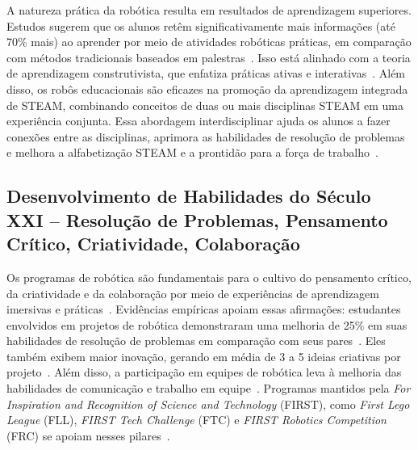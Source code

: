 \documentclass[%
  a4paper,%
  12pt,%
  fleqn,%
  english,%
  brazilian,%
]{article}
\begin{document}
A natureza prática da robótica resulta em resultados de aprendizagem superiores. Estudos sugerem que os alunos retêm significativamente mais informações (até 70\% mais) ao aprender por meio de atividades robóticas práticas, em comparação com métodos tradicionais baseados em palestras~\cite{acebottImportanceRobotics2025}. Isso está alinhado com a teoria de aprendizagem construtivista, que enfatiza práticas ativas e interativas~\cite{ross2024BeyondExhibits}. Além disso, os robôs educacionais são eficazes na promoção da aprendizagem integrada de STEAM, combinando conceitos de duas ou mais disciplinas STEAM em uma experiência conjunta. Essa abordagem interdisciplinar ajuda os alunos a fazer conexões entre as disciplinas, aprimora as habilidades de resolução de problemas e melhora a alfabetização STEAM e a prontidão para a força de trabalho~\cite{ross2024BeyondExhibits}.

\subsection{Desenvolvimento de Habilidades do Século XXI -- Resolução de Problemas, Pensamento Crítico, Criatividade, Colaboração}

Os programas de robótica são fundamentais para o cultivo do pensamento crítico, da criatividade e da colaboração por meio de experiências de aprendizagem imersivas e práticas~\cite{meegleYouthRobotics2025}. Evidências empíricas apoiam essas afirmações: estudantes envolvidos em projetos de robótica demonstraram uma melhoria de 25\% em suas habilidades de resolução de problemas em comparação com seus pares~\cite{acebottImportanceRobotics2025}. Eles também exibem maior inovação, gerando em média de 3 a 5 ideias criativas por projeto~\cite{acebottImportanceRobotics2025}. Além disso, a participação em equipes de robótica leva à melhoria das habilidades de comunicação e trabalho em equipe~\cite{acebottImportanceRobotics2025}. Programas mantidos pela \textit{For Inspiration and Recognition of Science and Technology} (FIRST), como \textit{First Lego League} (FLL), \textit{FIRST Tech Challenge} (FTC) e \textit{FIRST Robotics Competition} (FRC) se apoiam nesses pilares~\cite{firstRobotics2025}.
\end{document}
